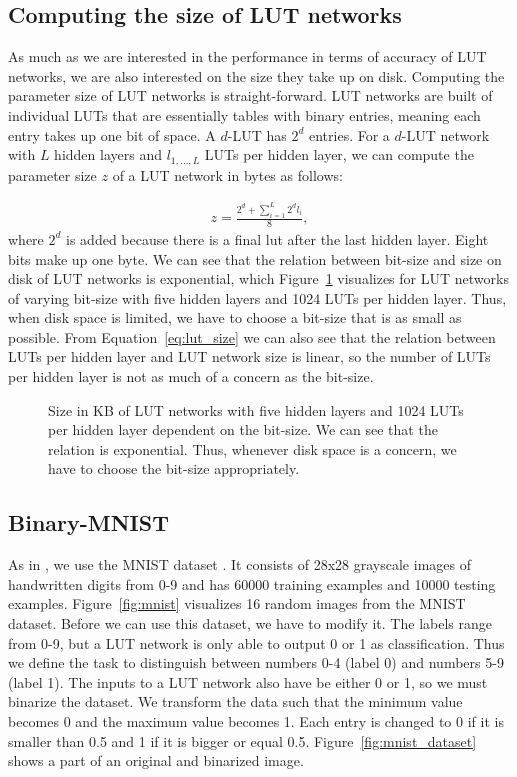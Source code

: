 \subsection{Computing the size of LUT networks} \label{sec:lut_network_size}
As much as we are interested in the performance in terms of accuracy of LUT networks, we are also interested on the size they take up on disk. Computing the parameter size of LUT networks is straight-forward. LUT networks are built of individual LUTs that are essentially tables with binary entries, meaning each entry takes up one bit of space. A $d$-LUT has $2^d$ entries. For a $d$-LUT network with $L$ hidden layers and $l_{1, \dots, L}$ LUTs per hidden layer, we can compute the parameter size $z$ of a LUT network in bytes as follows:

\begin{align} \label{eq:lut_size}
  z = \frac{2^d + \sum\limits_{i=1}^L 2^d l_i}{8},
\end{align}where $2^d$ is added because there is a final lut after the last hidden layer. Eight bits make up one byte. We can see that the relation between bit-size and size on disk of LUT networks is exponential, which Figure~\ref{fig:lut_size} visualizes for LUT networks of varying bit-size with five hidden layers and 1024 LUTs per hidden layer. Thus, when disk space is limited, we have to choose a bit-size that is as small as possible. From Equation~\ref{eq:lut_size} we can also see that the relation between LUTs per hidden layer and LUT network size is linear, so the number of LUTs per hidden layer is not as much of a concern as the bit-size.

\begin{figure}[!htb]
  \centering
  
  \caption{Size in KB of LUT networks with five hidden layers and 1024 LUTs per hidden layer dependent on the bit-size. We can see that the relation is exponential. Thus, whenever disk space is a concern, we have to choose the bit-size appropriately.}
\label{fig:lut_size}
\end{figure}
\FloatBarrier

\subsection{Binary-MNIST}
As in \cite{bib:chatterjee2018learning}, we use the MNIST dataset \cite{bib:mnist}. It consists of 28x28 grayscale images of handwritten digits from 0-9 and has 60000 training examples and 10000 testing examples. Figure~\ref{fig:mnist} visualizes 16 random images from the MNIST dataset. Before we can use this dataset, we have to modify it. The labels range from 0-9, but a LUT network is only able to output 0 or 1 as classification. Thus we define the task to distinguish between numbers 0-4 (label 0) and numbers 5-9 (label 1). The inputs to a LUT network also have be either 0 or 1, so we must binarize the dataset. We transform the data such that the minimum value becomes 0 and the maximum value becomes 1. Each entry is changed to 0 if it is smaller than 0.5 and 1 if it is bigger or equal 0.5. Figure~\ref{fig:mnist_dataset} shows a part of an original and binarized image.

